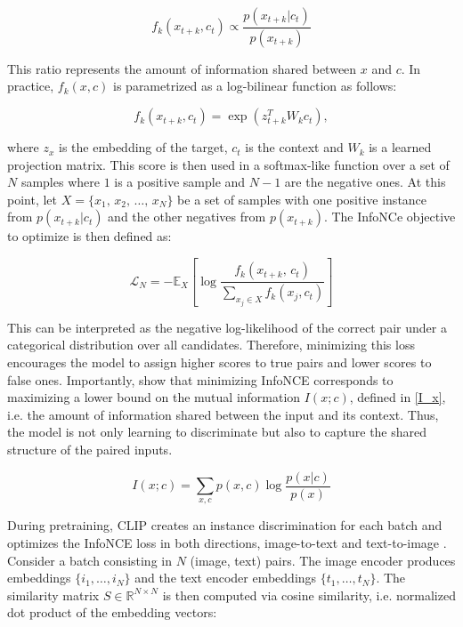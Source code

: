 \documentclass[a4paper, oneside, english]{sapthesis} %
\begin{document}
\begin{equation}\label{f_x}
    f_k(x_{t+k}, c_t) \propto \frac{p(x_{t+k}|c_t)}{p(x_{t+k})}
\end{equation}

This ratio represents the amount of information shared between $x$ and $c$. In practice, $f_k(x, c)$ is parametrized as a log-bilinear function as follows:

\begin{equation}\label{exp}
    f_k(x_{t+k}, c_t) = \exp \left( z^T_{t+k} W_k c_t \right),
\end{equation}

where $z_x$ is the embedding of the target, $c_t$ is the context and $W_k$ is a learned projection matrix. This score is then used in a softmax-like function over a set of $N$ samples where $1$ is a positive sample and $N - 1$ are the negative ones. At this point, let $X = \{x_1, \, x_2, \, \ldots, \, x_N\}$ be a set of samples with one positive instance from $p(x_{t+k} | c_t)$  and the other negatives from $p(x_{t+k})$. The InfoNCe objective to optimize is then defined as:

\begin{equation}\label{InfoNCE}
    \mathcal{L}_N = -\mathbb{E}_X \left[ \log \frac{f_k(x_{t+k}, \, c_t)}{\sum_{x_j \in X} f_k(x_j, c_t)} \right]
\end{equation}

This can be interpreted as the negative log-likelihood of the correct pair under a categorical distribution over all candidates. Therefore, minimizing this loss encourages the model to assign higher scores to true pairs and lower scores to false ones. Importantly, \cite{oord2018representation} show that minimizing InfoNCE corresponds to maximizing a lower bound on the mutual information $I(x;c)$, defined in \ref{I_x}, i.e. the amount of information shared between the input and its context. Thus, the model is not only learning to discriminate but also to capture the shared structure of the paired inputs.

\begin{equation}\label{I_x}
    I(x;c) = \sum_{x, c} p(x, c) \log \frac{p(x|c)}{p(x)}
\end{equation}

During pretraining, CLIP creates an instance discrimination for each batch and optimizes the InfoNCE loss in both directions, image-to-text and text-to-image \cite{radford2021learning} \cite{liu2024remoteclip}. Consider a batch consisting in $N$ (image, text) pairs. The image encoder produces embeddings $\{i_1, \ldots, i_N\}$ and the text encoder embeddings $\{t_1, \ldots, t_N\}$. The similarity matrix $S \in \mathbb{R}^{N \times N}$ is then computed via cosine similarity, i.e. normalized dot product of the embedding vectors:
\end{document}
